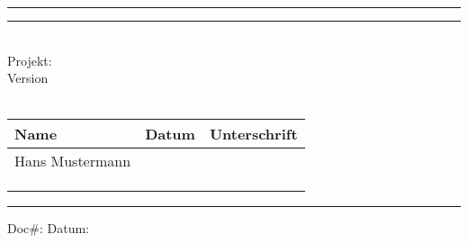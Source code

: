 
\hrule
{}
\hrule
\begin{center}
   	\begin{flushright}
   		\Huge
   		\titleinfo\\
   		\Large
   		Projekt: \subjectinfo\\
   		\large
   		Version \versioninfo\\
   		\authorinfo \\			
   	\end{flushright}
   	\renewcommand\arraystretch{1.5}
   	\begin{tabularx}{\linewidth}{|Z|Y|Z|}
   		\hline
   		\textbf{Name} & \textbf{Datum} & \textbf{Unterschrift}\\
   		\hline
   		Hans Mustermann & \printdate{\dateinfo} & \\
   		\hline
   		& & \\
   		\hline
   		& & \\
   		\hline
   		& & \\
        \hline
   	\end{tabularx}
\end{center}
\cfoot{}
\hrule
{
    \footnotesize 
    \begin{flushright}
        Doc\#: \docNr\linebreak
        Datum: \dateinfo
    \end{flushright}
}

\restoregeometry